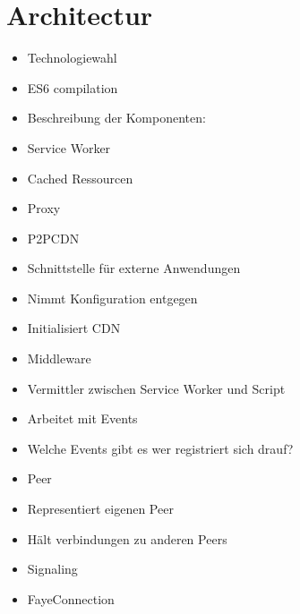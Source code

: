 %

\section{Architectur}

\begin{itemize}
  \item Technologiewahl
  \item ES6 compilation
  \item Beschreibung der Komponenten:
  \item Service Worker
  \item 	Cached Ressourcen
  \item 	Proxy
  \item P2PCDN
  \item 	Schnittstelle für externe Anwendungen
  \item 	Nimmt Konfiguration entgegen
  \item 	Initialisiert CDN
  \item Middleware
  \item 	Vermittler zwischen Service Worker und Script
  \item 	Arbeitet mit Events
  \item 	Welche Events gibt es wer registriert sich drauf?
  \item Peer
  \item 	Representiert eigenen Peer
  \item 	Hält verbindungen zu anderen Peers
  \item Signaling
  \item FayeConnection	
\end{itemize}


